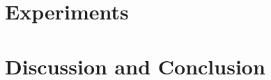\documentclass{article}
\begin{document}
\section{Experiments}\label{sec:experiments}


\section{Discussion and Conclusion}\label{sec:conclusion}






\clearpage
\appendix



\end{document}
